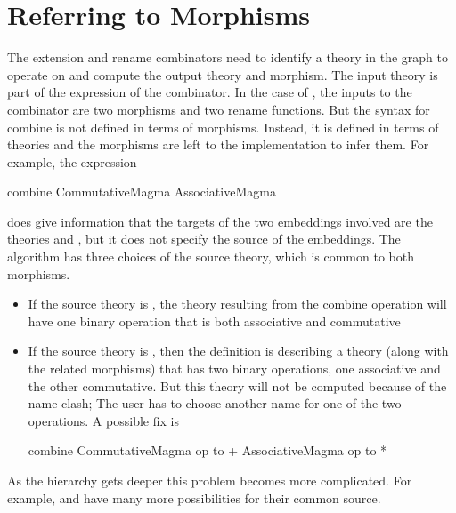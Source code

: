 \section{Referring to Morphisms}
\label{subsec:overPart}
The extension and rename combinators need to identify a theory in the graph to operate on and compute the output theory and morphism. The input theory is part of the expression of the combinator. 
In the case of , the inputs to the combinator are two morphisms and two rename functions. But the syntax for combine is not defined in terms of morphisms. Instead, it is defined in terms of theories and the morphisms are left to the implementation to infer them. 
For example, the expression 
\begin{togcode}
combine CommutativeMagma {} AssociativeMagma {}
\end{togcode}
\noindent does give information that the targets of the two embeddings involved are the theories   and , but it does not specify the source of the embeddings. The algorithm has three choices of the source theory, which is common to both morphisms. 
\begin{itemize}
    \item If the source theory is , the theory resulting from the combine operation will have one binary operation that is both associative and commutative 
    \item If the source theory is , then the definition is describing a theory (along with the related morphisms) that has two binary operations, one associative and the other commutative. But this theory will not be computed because of the name clash; The user has to choose another name for one of the two operations. A possible fix is 
    \begin{togcode}
combine CommutativeMagma {op to +} AssociativeMagma {op to *}
    \end{togcode}
\end{itemize}
As the hierarchy gets deeper this problem becomes more complicated. For example,  and  have many more possibilities for their common source. 

